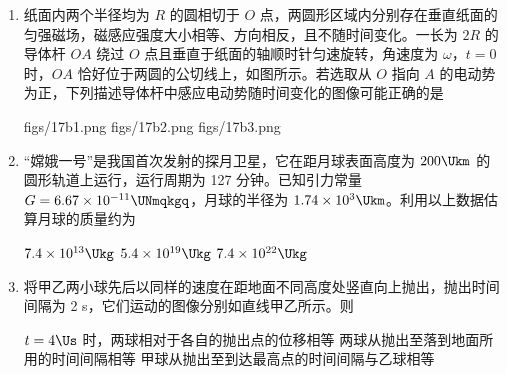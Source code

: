 \documentclass[\gkver]{gaokaozhenti}
\begin{document}
\begin{enumerate}
\item
纸面内两个半径均为 $R$ 的圆相切于 $O$ 点，两圆形区域内分别存在垂直纸面的匀强磁场，磁感应强度大小相等、方向相反，且不随时间变化。一长为 $2R$ 的导体杆 $OA$ 绕过 $O$ 点且垂直于纸面的轴顺时针匀速旋转，角速度为 $\omega$，$t=0$ 时，$OA$ 恰好位于两圆的公切线上，如图所示。若选取从 $O$ 指向 $A$ 的电动势为正，下列描述导体杆中感应电动势随时间变化的图像可能正确的是


{figs/17b1.png}
{figs/17b2.png}
{figs/17b3.png}


\item
“嫦娥一号”是我国首次发射的探月卫星，它在距月球表面高度为 $200\Ukm$ 的圆形轨道上运行，运行周期为 127 分钟。已知引力常量 $G=6.67\times10^{-11}\UNmqkgq$，月球的半径为 $1.74\times10^{3}\Ukm$。利用以上数据估算月球的质量约为

{$7.4\times10^{13}\Ukg$}
{$5.4\times10^{19}\Ukg$}
{$7.4\times10^{22}\Ukg$}


\item
将甲乙两小球先后以同样的速度在距地面不同高度处竖直向上抛出，抛出时间间隔为 2 s，它们运动的图像分别如直线甲乙所示。则


{$t=4\Us$ 时，两球相对于各自的抛出点的位移相等}
{两球从抛出至落到地面所用的时间间隔相等}
{甲球从抛出至到达最高点的时间间隔与乙球相等}


\end{enumerate}
\end{document}

